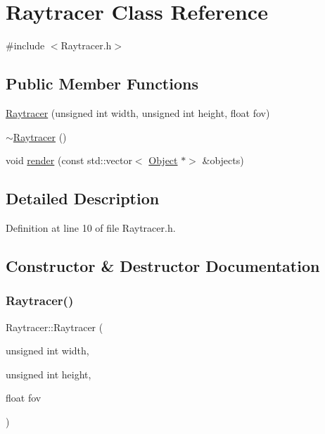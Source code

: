 \hypertarget{class_raytracer}{}\section{Raytracer Class Reference}
\label{class_raytracer}


{\ttfamily \#include $<$Raytracer.\+h$>$}

\subsection*{Public Member Functions}
\begin{DoxyCompactItemize}
\item 
\hyperlink{class_raytracer_a6be8b2ac76c00c1a59f507ebb51a94f9}{Raytracer} (unsigned int width, unsigned int height, float fov)
\item 
\hyperlink{class_raytracer_a610ba0d74edf864c8ed78c5d85c4480a}{$\sim$\+Raytracer} ()
\item 
void \hyperlink{class_raytracer_a881ef245d223dd1c9654b6f41c3e0a10}{render} (const std\+::vector$<$ \hyperlink{class_object}{Object} $\ast$$>$ \&objects)
\end{DoxyCompactItemize}


\subsection{Detailed Description}


Definition at line 10 of file Raytracer.\+h.



\subsection{Constructor \& Destructor Documentation}
\mbox{\label{class_raytracer_a6be8b2ac76c00c1a59f507ebb51a94f9}} 
\subsubsection{\texorpdfstring{Raytracer()}{Raytracer()}}
{\footnotesize\ttfamily Raytracer\+::\+Raytracer (\begin{DoxyParamCaption}\item[{unsigned int}]{width,  }\item[{unsigned int}]{height,  }\item[{float}]{fov }\end{DoxyParamCaption})}

